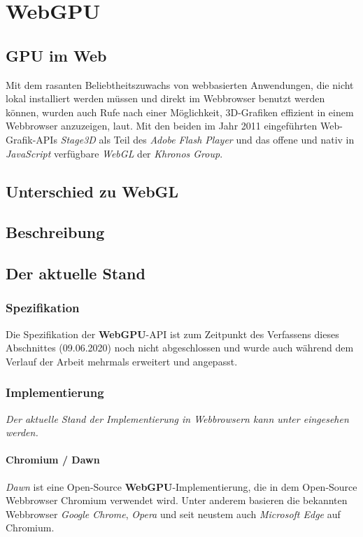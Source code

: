 \documentclass[oneside]{ausarbeitung}
\begin{document}
\chapter{WebGPU}
\label{cha:webgpu}

\section{GPU im Web}
Mit dem rasanten Beliebtheitszuwachs von webbasierten Anwendungen, die nicht lokal installiert werden müssen und direkt im Webbrowser benutzt werden können, wurden auch Rufe nach einer Möglichkeit, 3D-Grafiken effizient in einem Webbrowser anzuzeigen, laut. Mit den beiden im Jahr 2011 eingeführten Web-Grafik-APIs \textit{Stage3D} \cite{adobe:stage3d} als Teil des \textit{Adobe Flash Player} und das offene und nativ in \textit{JavaScript} verfügbare \textit{WebGL} \cite{khronos:webgl} der \textit{Khronos Group}.
\section{Unterschied zu WebGL}
\section{Beschreibung}
\section{Der aktuelle Stand}
\subsection{Spezifikation}
Die Spezifikation \cite{webgpu:api_spec} der \textbf{WebGPU}-\ac{API} ist zum Zeitpunkt des Verfassens dieses Abschnittes (09.06.2020) noch nicht abgeschlossen und wurde auch während dem Verlauf der Arbeit mehrmals erweitert und angepasst.

\subsection{Implementierung}
\textit{Der aktuelle Stand der Implementierung in Webbrowsern kann unter \cite{webgpu:implementation_status} eingesehen werden.}

\subsubsection{Chromium \cite{chromium} / Dawn \cite{google:dawn}}
\textit{Dawn} ist eine Open-Source \textbf{WebGPU}-Implementierung, die in dem Open-Source Webbrowser Chromium verwendet wird. Unter anderem basieren die bekannten Webbrowser \textit{Google Chrome}, \textit{Opera} und seit neustem auch \textit{Microsoft Edge} auf Chromium. 
\end{document}
